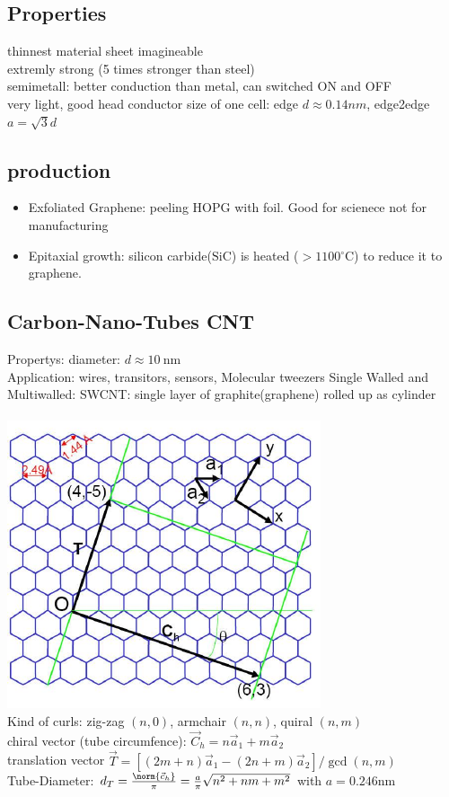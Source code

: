 \documentclass[fs, footer]{latex4ei}
\begin{document}
\begin{multicols}{4}
		\subsection{Properties}
		thinnest material sheet imagineable\\
		extremly strong (5 times stronger than steel)\\
		semimetall: better conduction than metal, can switched ON and OFF\\
		very light, good head conductor
		size of one cell: edge $d \approx 0.14nm$, edge2edge $a = \sqrt 3 d$\\
		
		
		\subsection{production}
		\begin{itemize}
			\item Exfoliated Graphene: peeling HOPG with foil. Good for scienece not for manufacturing
			\item Epitaxial growth: silicon carbide($\mathrm{SiC}$) is heated ($>1100 {}^\circ$C) to reduce it to graphene.
		\end{itemize}
	
	\subsection{Carbon-Nano-Tubes CNT}
	Propertys: diameter: $d \approx \SI{10}{\nano \meter}$\\
	Application: wires, transitors, sensors, Molecular tweezers
	Single Walled and Multiwalled:
	SWCNT: single layer of graphite(graphene) rolled up as cylinder\\
	\\
	\includegraphics{./img/chirality.pdf}
	\\
	Kind of curls: zig-zag $(n,0)$, armchair $(n,n)$, quiral $(n,m)$\\
	chiral vector (tube circumfence): $\vec C_h = n \vec a_1 + m \vec a_2$\\
	translation vector $\vec T = [(2m+n) \vec a_1 -(2n+m) \vec a_2] / \gcd(n,m)$\\
	Tube-Diameter: $d_T = \frac{\norm{\vec c_h}}{\pi} = \frac{a}{\pi} \sqrt{n^2 + nm + m^2}$ \quad with $a = 0.246$nm\\
		

\end{multicols}
\end{document}

